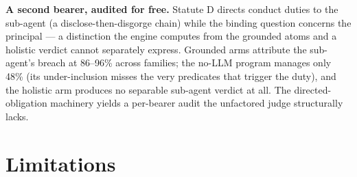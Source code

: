 \textbf{A second bearer, audited for free.} Statute D directs conduct duties
to the sub-agent (a disclose-then-disgorge chain) while the binding question
concerns the principal --- a distinction the engine computes from the
grounded atoms and a holistic verdict cannot separately express. Grounded
arms attribute the sub-agent's breach at 86--96\% across families; the no-LLM
program manages only 48\% (its under-inclusion misses the very predicates
that trigger the duty), and the holistic arm produces no separable sub-agent
verdict at all. The directed-obligation machinery yields a per-bearer audit
the unfactored judge structurally lacks.

\section{Limitations}

